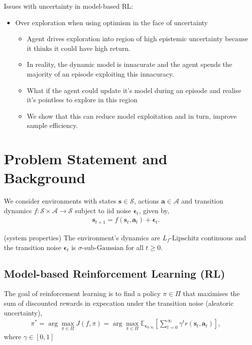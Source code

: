 \documentclass{article}
\newcommand{\state}{\ensuremath{\mathbf{s}}}
\newcommand{\action}{\ensuremath{\mathbf{a}}}
\newcommand{\noise}{\ensuremath{\bm\epsilon}}
\newcommand{\discount}{\ensuremath{\gamma}}
\newcommand{\stateDomain}{\ensuremath{\mathcal{S}}}
\newcommand{\actionDomain}{\ensuremath{\mathcal{A}}}
\newcommand{\policyDomain}{\ensuremath{\Pi}}
\newcommand{\rewardFn}{\ensuremath{r}}
\newcommand{\transitionFn}{\ensuremath{f}}
\newcommand{\policy}{\ensuremath{\pi}}
\begin{document}
Issues with uncertainty in model-based RL:
\begin{itemize}
  \item Over exploration when using optimism in the face of uncertainty
  \begin{itemize}
    \item Agent drives exploration into region of high epistemic uncertainty because it thinks it could have high return.
    \item In reality, the dynamic model is innacurate and the agent spends the majority of an episode exploiting this innacuracy.
    \item What if the agent could update it's model during an episode and realise it's pointless to explore in this region
    \item We show that this can reduce model exploitation and in turn, improve sample efficiency.
  \end{itemize}
\end{itemize}

\section{Problem Statement and Background} \label{sec:problem-statement}
We consider environments with states \(\state \in \stateDomain \), actions \(\action \in \actionDomain\) and transition dynamics \(\transitionFn: \stateDomain \times \actionDomain \rightarrow \stateDomain \) subject to
iid noise \(\noise_{t}\), given by,
\begin{align}
\state_{t+1} = \transitionFn(\state_{t}, \action_{t}) + \noise_{t}.
\end{align}
\begin{assumption}
  (system properties) The environment's dynamics are $L_{\transitionFn}\text{-Lipschitz}$ continuous and the transition noise $\noise_{t}$ is $\sigma\text{-sub-Gaussian}$ for all $t \geq 0$.
\end{assumption}

\subsection{Model-based Reinforcement Learning (RL)}
The goal of reinforcement learning is to find a policy \(\pi \in \Pi\) that maximises the sum of discounted
rewards in expecation under the transition noise (aleatoric uncertainty),
\begin{align} \label{eq-model-free-objective}
\policy^{*} = \arg \max_{\policy \in \policyDomain} J(\transitionFn, \policy) = \arg \max_{\policy \in \policyDomain} \mathbb{E}_{\noise_{0:\infty}} \left[ \sum_{t=0}^{\infty} \discount^{t} \rewardFn(\state_{t},\action_{t}) \right],
\end{align}
where $\gamma \in [0, 1]$
\end{document}
